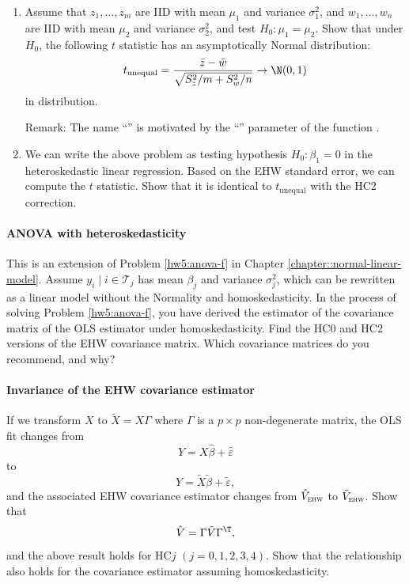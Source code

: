 \begin{enumerate}
\item Assume that $z_{1},\ldots,z_{m}$ are IID with mean $\mu_{1}$ and
variance $\sigma_{1}^{2}$, and $w_{1},\ldots,w_{n}$ are IID with
mean $\mu_{2}$ and variance $\sigma_{2}^{2}$, and test
$H_0: \mu_{1}=\mu_{2}$. Show that under $H_0$, the following
$t$ statistic has an asymptotically Normal distribution:
\[
t_{\text{unequal}}=\frac{\bar{z}-\bar{w}}{\sqrt{S_{z}^{2}/m+S_{w}^{2}/n}}\rightarrow \N(0,1)
\]
in distribution. 

Remark: 
The name  ``'' is motivated by the ``''
parameter of the  function .

\item We can write the above problem as testing hypothesis $H_{0}:\beta_{1}=0$ in the heteroskedastic linear regression. Based on the EHW standard error, we can compute the $t$ statistic.
Show that it is identical to $t_{\text{unequal}}$ with the HC2 correction.
\end{enumerate}


\paragraph{ANOVA with heteroskedasticity}\label{hw8::anova-ols-hc02}

This is an extension of Problem \ref{hw5:anova-f} in Chapter \ref{chapter::normal-linear-model}. 
Assume $y_i \mid i \in \mathcal{T}_j $ has mean $\beta_j$ and variance $\sigma_j^2$, which can be rewritten as a linear model without the Normality and homoskedasticity. In the process of solving Problem \ref{hw5:anova-f}, you have derived the estimator of the covariance matrix of the OLS estimator under homoskedasticity. Find the  HC0 and HC2 versions of the EHW covariance matrix. Which covariance matrices do you recommend, and why? 

 


 
 \paragraph{Invariance of the EHW covariance estimator}
\label{hw08::invariance-ehw01234}



If we transform $X$ to $\tilde{X} = X\Gamma$ where $\Gamma$ is a $p\times p$ non-degenerate matrix, the OLS fit changes from
$$
Y = X\hat{\beta} + \hat{\varepsilon}
$$
to
$$
Y = \tilde{X}\tilde{\beta} + \tilde{\varepsilon},
$$
and the associated EHW covariance estimator changes from $\hat{V}_\textsc{ehw}$ to $\tilde{V}_\textsc{ehw}$. Show that
$$
\hat{V} = \Gamma \tilde{V}  \Gamma^{\T},
$$ 
and the above result holds for HC$j$ $(j=0,1,2,3,4)$. Show that the relationship also holds for the covariance estimator assuming homoskedasticity. 


